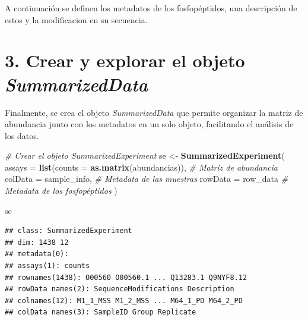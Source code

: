 \documentclass[
]{article}
\newenvironment{Shaded}{\begin{snugshade}}{\end{snugshade}}
\newcommand{\AttributeTok}[1]{\textcolor[rgb]{0.13,0.29,0.53}{#1}}
\newcommand{\CommentTok}[1]{\textcolor[rgb]{0.56,0.35,0.01}{\textit{#1}}}
\newcommand{\FunctionTok}[1]{\textcolor[rgb]{0.13,0.29,0.53}{\textbf{#1}}}
\newcommand{\NormalTok}[1]{#1}
\newcommand{\OtherTok}[1]{\textcolor[rgb]{0.56,0.35,0.01}{#1}}
\newcommand{\SpecialCharTok}[1]{\textcolor[rgb]{0.81,0.36,0.00}{\textbf{#1}}}
\begin{document}
A continuación se definen los metadatos de los fosfopéptidos, una
descripción de estos y la modificacion en su secuencia.

\begin{Shaded}
\end{Shaded}

\section{\texorpdfstring{3. Crear y explorar el objeto
\emph{SummarizedData}}{3. Crear y explorar el objeto SummarizedData}}\label{crear-y-explorar-el-objeto-summarizeddata}

Finalmente, se crea el objeto \emph{SummarizedData} que permite
organizar la matriz de abundancia junto con los metadatos en un solo
objeto, facilitando el análisis de los datos.

\begin{Shaded}
\begin{Highlighting}[]
\CommentTok{\# Crear el objeto SummarizedExperiment}
\NormalTok{se }\OtherTok{\textless{}{-}} \FunctionTok{SummarizedExperiment}\NormalTok{(}
    \AttributeTok{assays =} \FunctionTok{list}\NormalTok{(}\AttributeTok{counts =} \FunctionTok{as.matrix}\NormalTok{(abundancias)),  }\CommentTok{\# Matriz de abundancia}
    \AttributeTok{colData =}\NormalTok{ sample\_info,  }\CommentTok{\# Metadata de las muestras}
    \AttributeTok{rowData =}\NormalTok{ row\_data  }\CommentTok{\# Metadata de los fosfopéptidos}
\NormalTok{)}

\NormalTok{se}
\end{Highlighting}
\end{Shaded}

\begin{verbatim}
## class: SummarizedExperiment 
## dim: 1438 12 
## metadata(0):
## assays(1): counts
## rownames(1438): O00560 O00560.1 ... Q13283.1 Q9NYF8.12
## rowData names(2): SequenceModifications Description
## colnames(12): M1_1_MSS M1_2_MSS ... M64_1_PD M64_2_PD
## colData names(3): SampleID Group Replicate
\end{verbatim}
\end{document}
